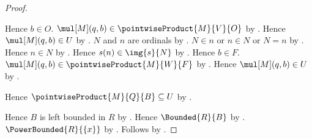 \begin{proof}
\begin{subproof}
\begin{subproof}
\begin{byCase}
                    Hence $b\in O$.
                    $\mul[M](q,b)\in\pointwiseProduct{M}{V}{O}$ by
                        .
                    Hence $\mul[M](q,b)\in U$ by .
                    $N$ and $n$ are ordinals by
                        .
                    $N\in n$ or $n\in N$ or $N=n$ by
                        .
                    Hence $n\in N$ by
                        .
                    Hence $s(n)\in\img{s}{N}$ by
                        .
                    Hence $b\in F$.
                    $\mul[M](q,b)\in\pointwiseProduct{M}{W}{F}$ by
                        .
                    Hence $\mul[M](q,b)\in U$ by .
            \end{byCase}
        \end{subproof}
        Hence $\pointwiseProduct{M}{Q}{B}\subseteq U$ by .
    \end{subproof}
    Hence $B$ is left bounded in $R$ by .
    Hence $\Bounded{R}{B}$ by
        .
    $\PowerBounded{R}{\{x\}}$ by .
    Follows by .
\end{proof}
